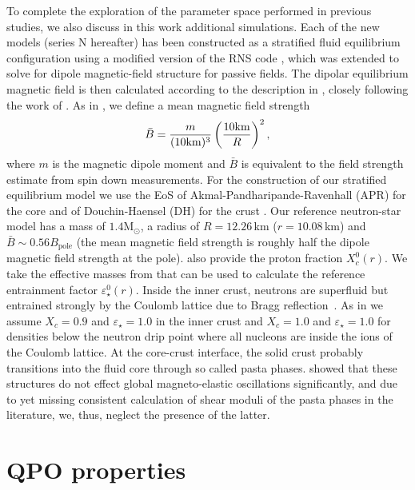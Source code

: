 \documentclass[useAMS,usenatbib]{mnras}
\begin{document}
To complete the exploration of the parameter space performed in previous 
studies, we also discuss in this work additional simulations. Each of the new 
models (series N hereafter) has been constructed as a stratified fluid 
equilibrium configuration using a modified 
version of the RNS code \citep{Stergioulas1995}, which was extended to solve for 
dipole magnetic-field structure for passive fields.  The dipolar equilibrium 
magnetic field is then calculated according to the description in 
\cite{Gabler2013a}, closely following the work of \cite{Bocquet1995}. As in 
\cite{Gabler2013a}, we define a mean magnetic field strength 
\begin{equation}
\bar B = \frac{m}{(10{\rm km})^3}\left(\frac{10{\rm km}}{R}\right)^2,
\end{equation}
where $m$ is the magnetic dipole moment and $\bar B$ is equivalent
to the field strength estimate from spin down measurements. For the 
construction of our stratified equilibrium model we use the EoS of 
Akmal-Pandharipande-Ravenhall (APR) for the core \citep{Akmal1998} and of 
Douchin-Haensel (DH) for the crust \citep{Douchin2001}. Our reference 
neutron-star model has a mass of $1.4\mathrm{M}_\odot$, a radius of 
$R=12.26\,$km ($r=10.08\,$km)  and $\bar B\sim0.56B_\mathrm{pole}$ (the mean 
magnetic field strength
is roughly half the dipole magnetic field strength at the pole). 
\citet{Douchin2001} also provide the proton 
fraction $X_c^0(r)$. We take the effective masses from \cite{Chamel2008} that 
can be used to calculate the reference entrainment factor 
$\varepsilon_\star^0(r)$. Inside the inner crust, neutrons are superfluid but 
entrained strongly by the Coulomb lattice due to Bragg 
reflection~\citep{Chamel2012}. As in \cite{Gabler2016} we assume $X_c=0.9$ and 
$\varepsilon_\star=1.0$ in the inner crust and $X_c=1.0$ and 
$\varepsilon_\star=1.0$ for densities below the neutron drip point where all 
nucleons are inside the ions of the Coulomb lattice.
At the core-crust interface, the solid crust probably transitions into the 
fluid core through so called pasta phases. \cite{Passamonti2016} showed that 
these structures do not effect global magneto-elastic oscillations 
significantly, and due to yet missing consistent calculation of shear moduli 
of the pasta phases in the literature, we, thus, neglect the presence of the 
latter.
%
\section{QPO properties}\label{sec_model}
\end{document}
